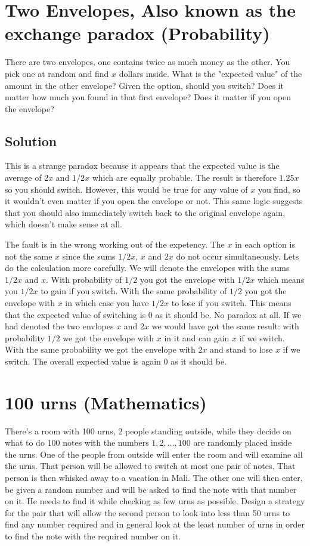 \documentclass{article}
\begin{document}
\section{Two Envelopes, Also known as the exchange paradox (Probability)}
There are two envelopes, one contains twice as much money as the other. You pick one at random and find $x$ dollars inside. What is the "expected value" of the amount in the other envelope? Given the option, should you switch? Does it matter how much you found in that first envelope? Does it matter if you open the envelope?

\subsection{Solution}
This is a strange paradox because it appears that the expected value is the average of $2x$ and $1/2x$ which are equally probable. The result is therefore $1.25x$ so you should switch. However, this would be true for any value of $x$ you find, so it wouldn't even matter if you open the envelope or not. This same logic suggests that you should also immediately switch back to the original envelope again, which doesn't make sense at all.

The fault is in the wrong working out of the expetency. The $x$ in each option is not the same $x$ since the sums $1/2x$, $x$ and $2x$ do not occur simultaneously. Lets do the calculation more carefully. We will denote the envelopes with the sums $1/2x$ and $x$. With probability of $1/2$ you got the envelope with $1/2x$ which means you $1/2x$ to gain if you switch. With the same probability of $1/2$ you got the envelope with $x$ in which case you have $1/2x$ to lose if you switch. This means that the expected value of switching is $0$ as it should be. No paradox at all. If we had denoted the two envlopes $x$ and $2x$ we would have got the same result: with probability $1/2$ we got the envelope with $x$ in it and can gain $x$ if we switch. With the same probability we got the envelope with $2x$ and stand to lose $x$ if we switch. The overall expected value is again $0$ as it should be.

\section{100 urns (Mathematics)}
There's a room with 100 urns, 2 people standing outside, while they decide on what to do 100 notes with the numbers $1, 2, \ldots,100$ are randomly placed inside the urns. One of the people from outside will enter the room and will examine all the urns. That person will be allowed to switch at most one pair of notes. That person is then whisked away to a vacation in Mali. The other one will then enter, be given a random number and will be asked to find the note with that number on it. He needs to find it while checking as few urns as possible. Design a strategy for the pair that will allow the second person to look into less than 50 urns to find any number required and in general look at the least number of urns in order to find the note with the required number on it.
\end{document}
